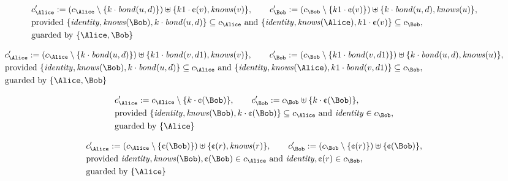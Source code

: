 \begin{align*}
&
c'_
{
\Alice
}
 := 
(c_
{
\Alice
}
 \setminus 
\{
k
\cdot
\mathit{
bond
}
(
u
,
d
)
\}
) \uplus 
\{
k1
\cdot
\text{\textcent}
(
v
)
,
\mathit{
knows
}
(
v
)
\}
, \qquad 
c'_
{
\Bob
}
 := 
(c_
{
\Bob
}
 \setminus 
\{
k1
\cdot
\text{\textcent}
(
v
)
\}
) \uplus 
\{
k
\cdot
\mathit{
bond
}
(
u
,
d
)
,
\mathit{
knows
}
(
u
)
\}
,\\
&
\text{provided } 
\{
\mathit{
identity
}
,
\mathit{
knows
}
(
\Bob
)
,
k
\cdot
\mathit{
bond
}
(
u
,
d
)
\}
 \subseteq c_
{
\Alice
}
 \text{ and } 
\{
\mathit{
identity
}
,
\mathit{
knows
}
(
\Alice
)
,
k1
\cdot
\text{\textcent}
(
v
)
\}
 \subseteq c_
{
\Bob
}
,\\
&
\text{guarded by } \{
\Alice
,
\Bob
\}
\end{align*}

\begin{align*}
&
c'_
{
\Alice
}
 := 
(c_
{
\Alice
}
 \setminus 
\{
k
\cdot
\mathit{
bond
}
(
u
,
d
)
\}
) \uplus 
\{
k1
\cdot
\mathit{
bond
}
(
v
,
d1
)
,
\mathit{
knows
}
(
v
)
\}
, \qquad 
c'_
{
\Bob
}
 := 
(c_
{
\Bob
}
 \setminus 
\{
k1
\cdot
\mathit{
bond
}
(
v
,
d1
)
\}
) \uplus 
\{
k
\cdot
\mathit{
bond
}
(
u
,
d
)
,
\mathit{
knows
}
(
u
)
\}
,\\
&
\text{provided } 
\{
\mathit{
identity
}
,
\mathit{
knows
}
(
\Bob
)
,
k
\cdot
\mathit{
bond
}
(
u
,
d
)
\}
 \subseteq c_
{
\Alice
}
 \text{ and } 
\{
\mathit{
identity
}
,
\mathit{
knows
}
(
\Alice
)
,
k1
\cdot
\mathit{
bond
}
(
v
,
d1
)
\}
 \subseteq c_
{
\Bob
}
,\\
&
\text{guarded by } \{
\Alice
,
\Bob
\}
\end{align*}

\begin{align*}
&
c'_
{
\Alice
}
 := 
c_
{
\Alice
}
 \setminus 
\{
k
\cdot
\text{\textcent}
(
\Bob
)
\}
, \qquad 
c'_
{
\Bob
}
 := 
c_
{
\Bob
}
 \uplus 
\{
k
\cdot
\text{\textcent}
(
\Bob
)
\}
,\\
&
\text{provided } 
\{
\mathit{
identity
}
,
\mathit{
knows
}
(
\Bob
)
,
k
\cdot
\text{\textcent}
(
\Bob
)
\}
 \subseteq c_
{
\Alice
}
 \text{ and } 
\mathit{
identity
}
 \in c_
{
\Bob
}
,\\
&
\text{guarded by } \{
\Alice
\}
\end{align*}

\begin{align*}
&
c'_
{
\Alice
}
 := 
(c_
{
\Alice
}
 \setminus 
\{
\text{\textcent}
(
\Bob
)
\}
) \uplus 
\{
\text{\textcent}
(
r
)
,
\mathit{
knows
}
(
r
)
\}
, \qquad 
c'_
{
\Bob
}
 := 
(c_
{
\Bob
}
 \setminus 
\{
\text{\textcent}
(
r
)
\}
) \uplus 
\{
\text{\textcent}
(
\Bob
)
\}
,\\
&
\text{provided } 
\mathit{
identity
}
,
\mathit{
knows
}
(
\Bob
)
,
\text{\textcent}
(
\Bob
)
 \in c_
{
\Alice
}
 \text{ and } 
\mathit{
identity
}
,
\text{\textcent}
(
r
)
 \in c_
{
\Bob
}
,\\
&
\text{guarded by } \{
\Alice
\}
\end{align*}
